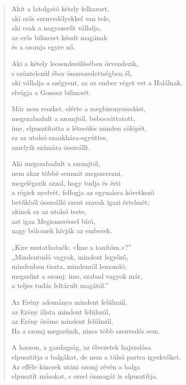 \begin{verse}
 Akit a latolgató kétely felkavart,\\
aki erős szenvedélyekkel van tele,\\
aki csak a nagyszerűt vállalja,\\
az erős bilincset készít magának\\
és a szomja egyre nő.

 Aki a kétely lecsendesülésében örvendezik,\\
s szüntelenül éber összeszedettségben él,\\
aki vállalja a szégyent, az az ember véget vet a Halálnak,\\
elvágja a Gonosz bilincsét.

 Már nem reszket, elérte a megbizonyosodást,\\
megszabadult a szomjtól, bebocsáttatott,\\
íme, elpusztította a létesülés minden cölöpét,\\
ez az utolsó szankhára-együttes,\\
amelyik számára összeállt.

 Aki megszabadult a szomjtól,\\
nem akar többé semmit megszerezni,\\
megelégszik azzal, hogy tudja és érti\\
a régiek nyelvét, felfogja az egymásra következő\\
betűkből összeálló szent szavak igazi értelmét;\\
akinek ez az utolsó teste,\\
azt igaz Megismeréssel bíró,\\
nagy bölcsnek hívják az emberek.

 „Kire mutathatnék: «Íme a tanítóm.»?”\\
„Mindentudó vagyok, mindent legyőző,\\
mindenben tiszta, mindenről lemondó;\\
megszűnt a szomj: íme, szabad vagyok már,\\
a teljes tudás feltárult magától.”

 Az Erény adománya mindent felülmúl,\\
az Erény illata mindent felülmúl,\\
az Erény öröme mindent felülmúl.\\
Ha a szomj megszűnik, nincs több szenvedés sem.

 A haszon, a gazdagság, az élvezetek hajszolása\\
elpusztítja a balgákat, de nem a túlsó partra igyekvőket.\\
Az efféle kincsek utáni szomj révén a balga\\
elpusztít másokat, s ezzel önmagát is elpusztítja.


\end{verse}
